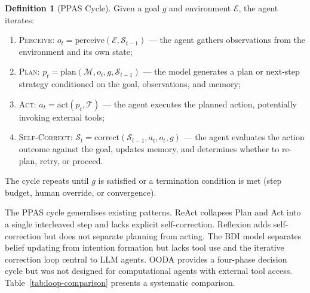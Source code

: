 \documentclass[review,authoryear]{elsarticle}
\theoremstyle{definition}
\newtheorem{definition}{Definition}
\begin{document}
\begin{definition}[PPAS Cycle]
Given a goal $g$ and environment $\mathcal{E}$, the agent iterates:
\begin{enumerate}
    \item \textsc{Perceive}: $o_t = \text{perceive}(\mathcal{E}, \mathcal{S}_{t-1})$ --- the agent gathers observations from the environment and its own state;
    \item \textsc{Plan}: $p_t = \text{plan}(\mathcal{M}, o_t, g, \mathcal{S}_{t-1})$ --- the model generates a plan or next-step strategy conditioned on the goal, observations, and memory;
    \item \textsc{Act}: $a_t = \text{act}(p_t, \mathcal{T})$ --- the agent executes the planned action, potentially invoking external tools;
    \item \textsc{Self-Correct}: $\mathcal{S}_t = \text{correct}(\mathcal{S}_{t-1}, a_t, o_t, g)$ --- the agent evaluates the action outcome against the goal, updates memory, and determines whether to re-plan, retry, or proceed.
\end{enumerate}
The cycle repeats until $g$ is satisfied or a termination condition is met (step budget, human override, or convergence).
\end{definition}

The PPAS cycle generalises existing patterns. ReAct \citep{yao2023react} collapses Plan and Act into a single interleaved step and lacks explicit self-correction. Reflexion \citep{shinn2023reflexion} adds self-correction but does not separate planning from acting. The BDI model \citep{rao1995bdi} separates belief updating from intention formation but lacks tool use and the iterative correction loop central to LLM agents. OODA \citep{boyd1987ooda} provides a four-phase decision cycle but was not designed for computational agents with external tool access. Table~\ref{tab:loop-comparison} presents a systematic comparison.
\end{document}

